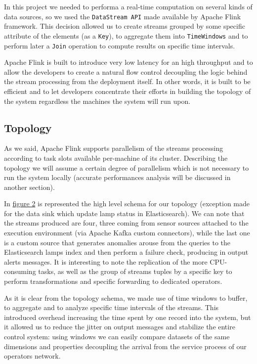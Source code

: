 In this project we needed to performa a real-time computation on several kinds of data sources, so we used the \texttt{DataStream API} made available by Apache Flink framework. This decision allowed us to create streams grouped by some specific attribute of the elements (as a \texttt{Key}), to aggregate them into \texttt{TimeWindows} and to perform later a \texttt{Join} operation to compute results on specific time intervals. 

Apache Flink is built to introduce very low latency for an high throughput and to allow the developers to create a natural flow control decoupling the logic behind the stream processing from the deployment itself. In other words, it is built to be efficient and to let developers concentrate their efforts in building the topology of the system regardless the machines the system will run upon.

\subsection{Topology}
As we said, Apache Flink supports parallelism of the streams processing according to task slots available per-machine of its cluster. Describing the topology we will assume a certain degree of parallelism which is not necessary to run the system locally (accurate performances analysis will be discussed in another section).

In \hyperref[fig:ember_topology]{figure 2} is represented the high level schema for our topology (exception made for the data sink which update lamp status in Elasticsearch). We can note that the streams produced are four, three coming from sensor sources attached to the execution environment (via Apache Kafka custom connectors), while the last one is a custom source that generates anomalies arouse from the queries to the Elasticsearch lamps index and then perform a failure check, producing in output alerts messages.
It is interesting to note the replication of the more CPU-consuming tasks, as well as the group of streams tuples by a specific key to perform transformations and specific forwarding to dedicated operators.

As it is clear from the topology schema, we made use of time windows to buffer, to aggregate and to analyze specific time intervals of the streams. This introduced overhead increasing the time spent by one record into the system, but it allowed us to reduce the jitter on output messages and stabilize the entire control system: using windows we can easily compare datasets of the same dimensions and properties decoupling the arrival from the service process of our operators network.

